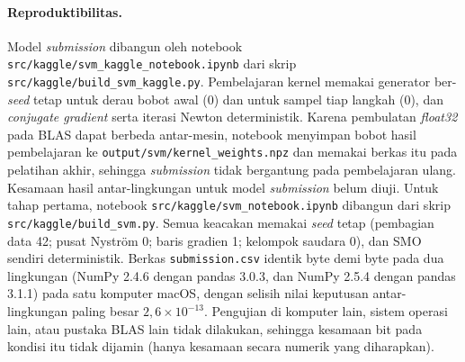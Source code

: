 \paragraph{Reproduktibilitas.} Model \textit{submission} dibangun oleh notebook \nolinkurl{src/kaggle/svm_kaggle_notebook.ipynb} dari skrip \nolinkurl{src/kaggle/build_svm_kaggle.py}. Pembelajaran kernel memakai generator ber-\textit{seed} tetap untuk derau bobot awal (0) dan untuk sampel tiap langkah (0), dan \textit{conjugate gradient} serta iterasi Newton deterministik. Karena pembulatan \textit{float32} pada BLAS dapat berbeda antar-mesin, notebook menyimpan bobot hasil pembelajaran ke \nolinkurl{output/svm/kernel_weights.npz} dan memakai berkas itu pada pelatihan akhir, sehingga \textit{submission} tidak bergantung pada pembelajaran ulang. Kesamaan hasil antar-lingkungan untuk model \textit{submission} belum diuji. Untuk tahap pertama, notebook \nolinkurl{src/kaggle/svm_notebook.ipynb} dibangun dari skrip \nolinkurl{src/kaggle/build_svm.py}. Semua keacakan memakai \textit{seed} tetap (pembagian data 42; pusat Nystr\"om 0; baris gradien 1; kelompok saudara 0), dan SMO sendiri deterministik. Berkas \texttt{submission.csv} identik byte demi byte pada dua lingkungan (NumPy 2.4.6 dengan pandas 3.0.3, dan NumPy 2.5.4 dengan pandas 3.1.1) pada satu komputer macOS, dengan selisih nilai keputusan antar-lingkungan paling besar $2{,}6 \times 10^{-13}$. Pengujian di komputer lain, sistem operasi lain, atau pustaka BLAS lain tidak dilakukan, sehingga kesamaan bit pada kondisi itu tidak dijamin (hanya kesamaan secara numerik yang diharapkan).
